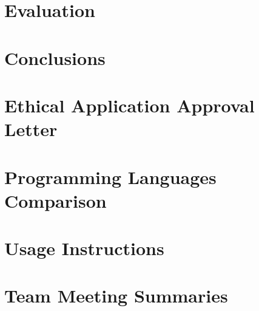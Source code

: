 \documentclass[11pt,openright,twoside,a4paper]{report}
\begin{document}
\chapter{Evaluation}
\label{ch:chapter-evaluation}


\chapter{Conclusions}
\label{ch:chapter-conclusions}




\appendix

\chapter{Ethical Application Approval Letter}
\label{ch:appendix-ethical-approval-letter}


\chapter{Programming Languages Comparison}
\label{ch:appendix-programming_languages_comparison}


\chapter{Usage Instructions}
\label{ch:appendix-usage-instructions}


\chapter{Team Meeting Summaries}
\label{ch:appendix-team-meeting-summaries}

\end{document}
